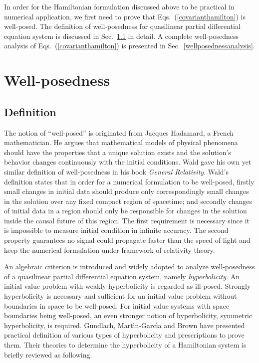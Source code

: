 In order for the Hamiltonian formulation discussed above to be practical in numerical application, we first need to prove that Eqs.~(\ref{covarianthamilton}) is well-posed. The definition of well-posedness for quasilinear partial differential equation system is discussed in Sec.~\ref{wellposednessdefinition} in detail. A complete well-posedness analysis of Eqs.~(\ref{covarianthamilton}) is presented in Sec.~\ref{wellposednessanalysis}.
\section{Well-posedness}\label{wellposedness}
\subsection{Definition}\label{wellposednessdefinition}
The notion of ``well-posed'' is originated from Jacques Hadamard, a French mathematician. He argues that mathematical models of physical phenomena should have the properties that a unique solution exists and the solution's behavior changes continuously with the initial conditions. Wald gave his own yet similar definition of well-posedness in his book {\em General Relativity}\cite[p. 244]{Wald:GRbook}. Wald's definition states that in order for a numerical formulation to be well-posed, firstly small changes in initial data should produce only correspondingly small changes in the solution over any fixed compact region of spacetime; and secondly changes of initial data in a region should only be responsible for changes in the solution inside the causal future of this region. The first requirement is necessary since it is impossible to measure initial condition in infinite accuracy. The second property guarantees no signal could propagate faster than the speed of light and keep the numerical formulation under framework of relativity theory. 

An algebraic criterion is introduced and widely adopted to analyze well-posedness of a quasilinear partial differential equation system, namely {\em hyperbolicity}. An initial value problem with weakly hyperbolicity is regarded as ill-posed. Strongly hyperbolicity is necessary and sufficient for an initial value problem without boundaries in space to be well-posed. For initial value systems with space boundaries being well-posed, an even stronger notion of hyperbolicity, symmetric hyperbolicity, is required. Gundlach, Mart\' \i n-Garc\' \i a\cite{Gundlach:2005ta} and Brown\cite{Brown:2008cca} have presented practical definition of various types of hyperbolicity and prescriptions to prove them. Their theories to determine the hyperbolicity of a Hamiltonian system is briefly reviewed as following. 

